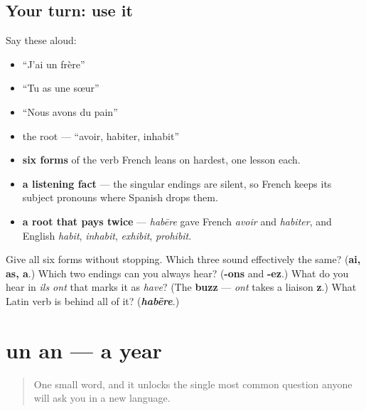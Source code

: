 \subsection*{Your turn: use it}
Say these aloud:

\begin{itemize}
\raggedright
  \item \textquotedblleft{}J'ai un frère\textquotedblright{}
  \item \textquotedblleft{}Tu as une sœur\textquotedblright{}
  \item \textquotedblleft{}Nous avons du pain\textquotedblright{}
  \item the root — \textquotedblleft{}avoir, habiter, inhabit\textquotedblright{}
\end{itemize}

\begin{grammarlens}[title={What you've built so far}]
\begin{itemize}
\raggedright
  \item \textbf{six forms} of the verb French leans on hardest, one lesson each.
  \item \textbf{a listening fact} — the singular endings are silent, so French keeps its subject pronouns where Spanish drops them.
  \item \textbf{a root that pays twice} — \emph{habēre} gave French \emph{avoir} and \emph{habiter}, and English \emph{habit}, \emph{inhabit}, \emph{exhibit}, \emph{prohibit}.
\end{itemize}
\end{grammarlens}

\begin{tcolorbox}[breakable,colback=teal!4,colframe=teal!35!black,title={Before you move on}]
Give all six forms without stopping. Which three sound effectively the same? (\textbf{ai, as, a}.) Which two endings can you always hear? (\textbf{-ons} and \textbf{-ez}.) What do you hear in \emph{ils ont} that marks it as \emph{have}? (The \textbf{buzz} — \emph{ont} takes a liaison \textbf{z}.) What Latin verb is behind all of it? (\emph{\textbf{habēre}}.)
\end{tcolorbox}
\section[un an, des ans]{un an — a year}

\label{lesson:FR-C14-an}



\begin{quote}
One small word, and it unlocks the single most common question anyone will ask you in a new language.
\end{quote}

